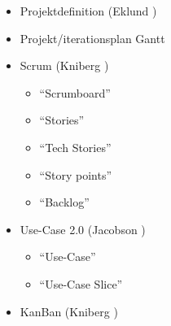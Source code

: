 \documentclass[conference,a4paper]{IEEEtran}
\begin{document}
\begin{itemize}
\item Projektdefinition (Eklund \cite[s. 137-146]{Eklund14})
\item Projekt/iterationsplan Gantt
\item Scrum (Kniberg \cite{Kniberg07})
  \begin{itemize}
    \item ``Scrumboard''
	  \item ``Stories''
    \item ``Tech Stories''
    \item ``Story points''
    \item ``Backlog''
\end{itemize}
\item Use-Case 2.0 (Jacobson \cite{Jacobson11})
	\begin{itemize}
	\item ``Use-Case''
  \item ``Use-Case Slice''
  \end{itemize}
\item KanBan (Kniberg \cite{Kniberg10})
\end{itemize}
\end{document}
